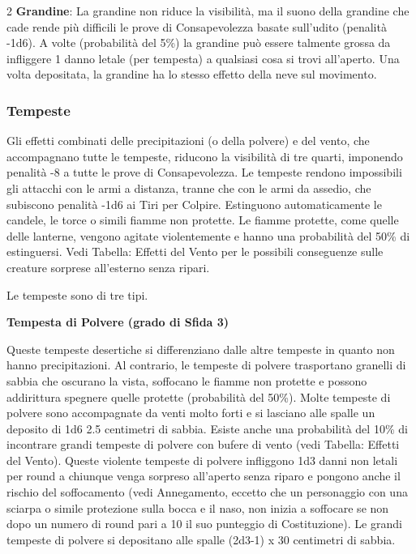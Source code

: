 \begin{multicols}{2}
\textbf{Grandine}: La grandine non riduce la visibilità, ma il suono della grandine che cade rende più difficili le prove di Consapevolezza basate sull'udito (penalità -1d6). A volte (probabilità del 5\%) la grandine può essere talmente grossa da infliggere 1 danno letale (per tempesta) a qualsiasi cosa si trovi all'aperto. Una volta depositata, la grandine ha lo stesso effetto della neve sul movimento.

\subsubsection{Tempeste}

\label{tempeste}

Gli effetti combinati delle precipitazioni (o della polvere) e del vento, che accompagnano tutte le tempeste, riducono la visibilità di tre quarti, imponendo penalità -8 a tutte le prove di Consapevolezza. Le tempeste rendono impossibili gli attacchi con le armi a distanza, tranne che con le armi da assedio, che subiscono penalità -1d6 ai Tiri per Colpire.
Estinguono automaticamente le candele, le torce o simili fiamme non protette. Le fiamme protette, come quelle delle lanterne, vengono agitate violentemente e hanno una probabilità del 50\% di estinguersi. Vedi Tabella: Effetti del Vento per le possibili conseguenze sulle creature sorprese all'esterno senza ripari.

Le tempeste sono di tre tipi.

\textbf{Tempesta di Polvere (grado di Sfida 3)}

Queste tempeste desertiche si differenziano dalle altre tempeste in quanto non hanno precipitazioni. Al contrario, le tempeste di polvere trasportano granelli di sabbia che oscurano la vista, soffocano le fiamme non protette e possono addirittura spegnere quelle protette (probabilità del 50\%). Molte tempeste di polvere sono accompagnate da venti molto forti e si lasciano alle spalle un deposito di 1d6 \texttimes{} 2.5 centimetri di sabbia.
Esiste anche una probabilità del 10\% di incontrare grandi tempeste di polvere con bufere di vento (vedi Tabella: Effetti del Vento). Queste violente tempeste di polvere infliggono 1d3 danni non letali per round a chiunque venga sorpreso all'aperto senza riparo e pongono anche il rischio del soffocamento (vedi Annegamento, eccetto che un personaggio con una sciarpa o simile protezione sulla bocca e il naso, non inizia a soffocare se non dopo un numero di round pari a 10 \texttimes{} il suo punteggio di Costituzione). Le grandi tempeste di polvere si depositano alle spalle (2d3-1) x 30 centimetri di sabbia.


\end{multicols}
